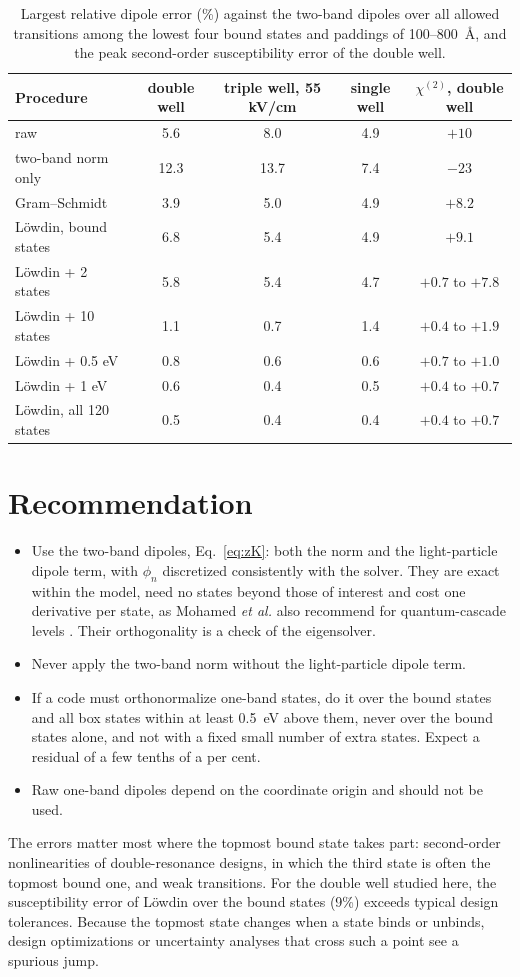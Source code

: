 \documentclass[11pt]{article}
\begin{document}
\begin{table}[t]
\centering
\small
\caption{Largest relative dipole error (\%) against the two-band dipoles over all allowed transitions among the lowest four bound states and paddings of 100--800~\AA, and the peak second-order susceptibility error of the double well.}
\label{tab:err}
\begin{tabular}{lcccc}
\toprule
Procedure & double well & triple well, 55 kV/cm & single well & $\chi^{(2)}$, double well \\
\midrule
raw & 5.6 & 8.0 & 4.9 & $+10$ \\
two-band norm only & 12.3 & 13.7 & 7.4 & $-23$ \\
Gram--Schmidt & 3.9 & 5.0 & 4.9 & $+8.2$ \\
L\"owdin, bound states & 6.8 & 5.4 & 4.9 & $+9.1$ \\
L\"owdin + 2 states & 5.8 & 5.4 & 4.7 & $+0.7$ to $+7.8$ \\
L\"owdin + 10 states & 1.1 & 0.7 & 1.4 & $+0.4$ to $+1.9$ \\
L\"owdin + 0.5 eV & 0.8 & 0.6 & 0.6 & $+0.7$ to $+1.0$ \\
L\"owdin + 1 eV & 0.6 & 0.4 & 0.5 & $+0.4$ to $+0.7$ \\
L\"owdin, all 120 states & 0.5 & 0.4 & 0.4 & $+0.4$ to $+0.7$ \\
\bottomrule
\end{tabular}
\end{table}

\section{Recommendation}
\begin{itemize}
\item Use the two-band dipoles, Eq.~\eqref{eq:zK}: both the norm and the light-particle dipole term, with $\phi_n$ discretized consistently with the solver. They are exact within the model, need no states beyond those of interest and cost one derivative per state, as Mohamed \emph{et al.} also recommend for quantum-cascade levels \cite{Mohamed2024}. Their orthogonality is a check of the eigensolver.
\item Never apply the two-band norm without the light-particle dipole term.
\item If a code must orthonormalize one-band states, do it over the bound states and all box states within at least 0.5~eV above them, never over the bound states alone, and not with a fixed small number of extra states. Expect a residual of a few tenths of a per cent.
\item Raw one-band dipoles depend on the coordinate origin and should not be used.
\end{itemize}
The errors matter most where the topmost bound state takes part: second-order nonlinearities of double-resonance designs, in which the third state is often the topmost bound one, and weak transitions. For the double well studied here, the susceptibility error of L\"owdin over the bound states (9\%) exceeds typical design tolerances. Because the topmost state changes when a state binds or unbinds, design optimizations or uncertainty analyses that cross such a point see a spurious jump.
\end{document}
